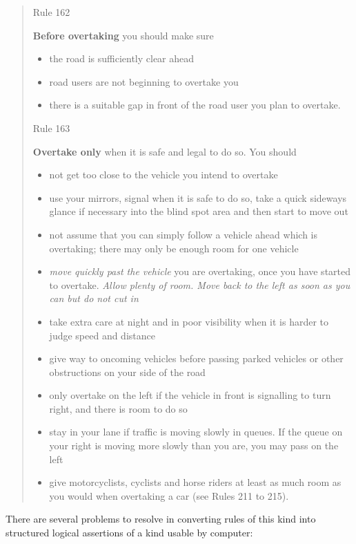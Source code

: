 \begin{quote}
    Rule 162
    
    \textbf{Before overtaking} you should make sure
    \begin{itemize}
        \item the road is sufficiently clear ahead
        \item road users are not beginning to overtake you
        \item there is a suitable gap in front of the road user you plan to overtake.
    \end{itemize}
    
    Rule 163
    
    \textbf{Overtake only} when it is safe and legal to do so. You should
    \begin{itemize}
        \item not get too close to the vehicle you intend to overtake
        \item use your mirrors, signal when it is safe to do so, take a quick sideways glance if necessary into the blind spot area and then start to move out
        \item not assume that you can simply follow a vehicle ahead which is overtaking; there may only be enough room for one vehicle
        \item \emph{move quickly past the vehicle} you are overtaking, once you have started to overtake. \emph{Allow plenty of room. Move back to the left as soon as you can but do not cut in}
        \item take extra care at night and in poor visibility when it is harder to judge speed and distance
        \item give way to oncoming vehicles before passing parked vehicles or other obstructions on your side of the road
        \item only overtake on the left if the vehicle in front is signalling to turn right, and there is room to do so
        \item stay in your lane if traffic is moving slowly in queues. If the queue on your right is moving more slowly than you are, you may pass on the left
        \item give motorcyclists, cyclists and horse riders at least as much room as you would when overtaking a car (see Rules 211 to 215).
    \end{itemize}
\end{quote}
There are several problems to resolve in converting rules of this kind into structured logical assertions of a kind usable by computer:
